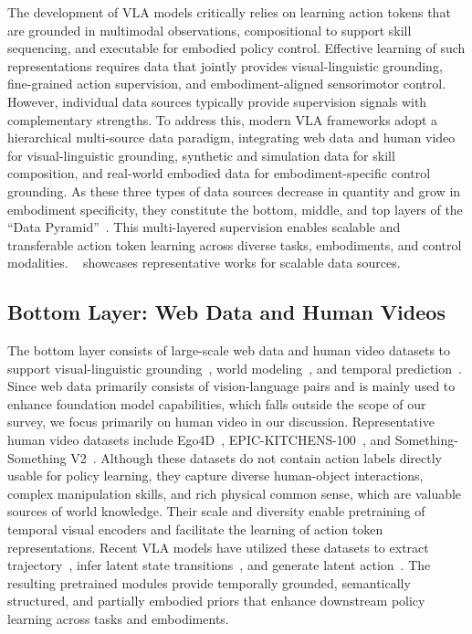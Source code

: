 \documentclass[10pt, a4paper, logo, copyright]{googledeepmind} %
\begin{document}
The development of VLA models critically relies on learning action tokens that are grounded in multimodal observations, compositional to support skill sequencing, and executable for embodied policy control. Effective learning of such representations requires data that jointly provides visual-linguistic grounding, fine-grained action supervision, and embodiment-aligned sensorimotor control. However, individual data sources typically provide supervision signals with complementary strengths. To address this, modern VLA frameworks adopt a hierarchical multi-source data paradigm, integrating web data and human video for visual-linguistic grounding, synthetic and simulation data for skill composition, and real-world embodied data for embodiment-specific control grounding. As these three types of data sources decrease in quantity and grow in embodiment specificity, they constitute the bottom, middle, and top layers of the “Data Pyramid”~\cite{nvidia2025gr00tn1openfoundation}. This multi-layered supervision enables scalable and transferable action token learning across diverse tasks, embodiments, and control modalities.
~ showcases representative works for scalable data sources.





\subsection{Bottom Layer: Web Data and Human Videos}
The bottom layer consists of large-scale web data and human video datasets to support visual-linguistic grounding~\cite{ravi2024sam, miech2019howto100m}, world modeling~\cite{MendoncaBP23, assran2025v}, and temporal prediction~\cite{Villar-Corrales_2022_BMVC}. Since web data primarily consists of vision-language pairs and is mainly used to enhance foundation model capabilities, which falls outside the scope of our survey, we focus primarily on human video in our discussion. Representative human video datasets include Ego4D~\cite{Ego4D2022CVPR}, EPIC-KITCHENS-100~\cite{Damen2021RESCALING}, and Something-Something V2~\cite{goyal2017something}. Although these datasets do not contain action labels directly usable for policy learning, they capture diverse human-object interactions, complex manipulation skills, and rich physical common sense, which are valuable sources of world knowledge. Their scale and diversity enable pretraining of temporal visual encoders and facilitate the learning of action token representations. Recent VLA models have utilized these datasets to extract trajectory~\cite{yang2025magma, niu2025pre}, infer latent state transitions~\cite{ye2024latent}, and generate latent action~\cite{nvidia2025gr00tn1openfoundation}. The resulting pretrained modules provide temporally grounded, semantically structured, and partially embodied priors that enhance downstream policy learning across tasks and embodiments.
\end{document}
